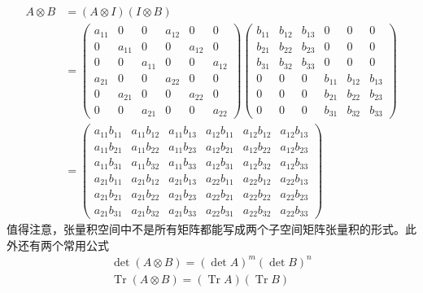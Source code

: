 \documentclass[a4paper,11pt]{article}
\begin{document}
    \begin{equation}
        \begin{split}
        A \otimes B&=(A\otimes I)(I\otimes B)\\
        &=\left(\begin{array}{ccc|ccc}
            a_{11} & 0 & 0 & a_{12} & 0 & 0 \\
            0 & a_{11} & 0 & 0 & a_{12} & 0 \\
            0 & 0 & a_{11} & 0 & 0 & a_{12} \\
            \hline a_{21} & 0 & 0 & a_{22} & 0 & 0 \\
            0 & a_{21} & 0 & 0 & a_{22} & 0 \\
            0 & 0 & a_{21} & 0 & 0 & a_{22}
            \end{array}\right)\left(\begin{array}{ccc|ccc}
                b_{11} & b_{12} & b_{13} & 0 & 0 & 0 \\
                b_{21} & b_{22} & b_{23} & 0 & 0 & 0 \\
                b_{31} & b_{32} & b_{33} & 0 & 0 & 0 \\
                \hline 0 & 0 & 0 & b_{11} & b_{12} & b_{13} \\
                0 & 0 & 0 & b_{21} & b_{22} & b_{23} \\
                0 & 0 & 0 & b_{31} & b_{32} & b_{33}
                \end{array}\right)\\
                &=\left(\begin{array}{ccc|ccc}
            a_{11} b_{11} & a_{11} b_{12} & a_{11} b_{13} & a_{12} b_{11} & a_{12} b_{12} & a_{12} b_{13} \\
            a_{11} b_{21} & a_{11} b_{22} & a_{11} b_{23} & a_{12} b_{21} & a_{12} b_{22} & a_{12} b_{23} \\
            a_{11} b_{31} & a_{11} b_{32} & a_{11} b_{33} & a_{12} b_{31} & a_{12} b_{32} & a_{12} b_{33} \\
            \hline a_{21} b_{11} & a_{21} b_{12} & a_{21} b_{13} & a_{22} b_{11} & a_{22} b_{12} & a_{22} b_{13} \\
            a_{21} b_{21} & a_{21} b_{22} & a_{21} b_{23} & a_{22} b_{21} & a_{22} b_{22} & a_{22} b_{23} \\
            a_{21} b_{31} & a_{21} b_{32} & a_{21} b_{33} & a_{22} b_{31} & a_{22} b_{32} & a_{22} b_{33}
            \end{array}\right)
        \end{split}
    \end{equation}
值得注意，张量积空间中不是所有矩阵都能写成两个子空间矩阵张量积的形式。此外还有两个常用公式
\begin{equation}
    \begin{array}{l}
        \operatorname{det}(A \otimes B)=(\operatorname{det} A)^{m}(\operatorname{det} B)^{n} \\
        \operatorname{Tr}(A \otimes B)=(\operatorname{Tr} A)(\operatorname{Tr} B)
        \end{array}
\end{equation}
\end{document}
